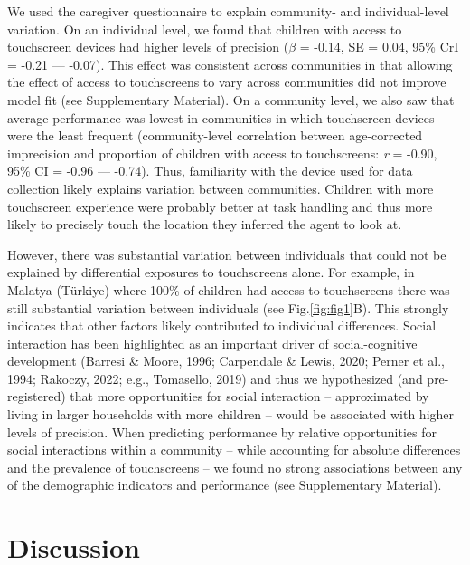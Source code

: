 \documentclass[
  man,floatsintext]{apa7}
\begin{document}
We used the caregiver questionnaire to explain community- and individual-level variation. On an individual level, we found that children with access to touchscreen devices had higher levels of precision (\(\beta\) = -0.14, SE = 0.04, 95\% CrI = -0.21 --- -0.07). This effect was consistent across communities in that allowing the effect of access to touchscreens to vary across communities did not improve model fit (see Supplementary Material). On a community level, we also saw that average performance was lowest in communities in which touchscreen devices were the least frequent (community-level correlation between age-corrected imprecision and proportion of children with access to touchscreens: \emph{r} = -0.90, 95\% CI = -0.96 --- -0.74). Thus, familiarity with the device used for data collection likely explains variation between communities. Children with more touchscreen experience were probably better at task handling and thus more likely to precisely touch the location they inferred the agent to look at.

However, there was substantial variation between individuals that could not be explained by differential exposures to touchscreens alone. For example, in Malatya (Türkiye) where 100\% of children had access to touchscreens there was still substantial variation between individuals (see Fig.\ref{fig:fig1}B). This strongly indicates that other factors likely contributed to individual differences. Social interaction has been highlighted as an important driver of social-cognitive development (Barresi \& Moore, 1996; Carpendale \& Lewis, 2020; Perner et al., 1994; Rakoczy, 2022; e.g., Tomasello, 2019) and thus we hypothesized (and pre-registered) that more opportunities for social interaction -- approximated by living in larger households with more children -- would be associated with higher levels of precision. When predicting performance by relative opportunities for social interactions within a community -- while accounting for absolute differences and the prevalence of touchscreens -- we found no strong associations between any of the demographic indicators and performance (see Supplementary Material).

\section{Discussion}\label{discussion}
\end{document}
